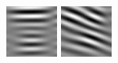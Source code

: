 \begin{figure}
\begin{center}
  \includegraphics[width=\columnwidth/9]{ch4/figures/imag_3_4.jpg}
  \includegraphics[width=\columnwidth/9]{ch4/figures/imag_3_5.jpg}

\end{center}
\end{figure}
